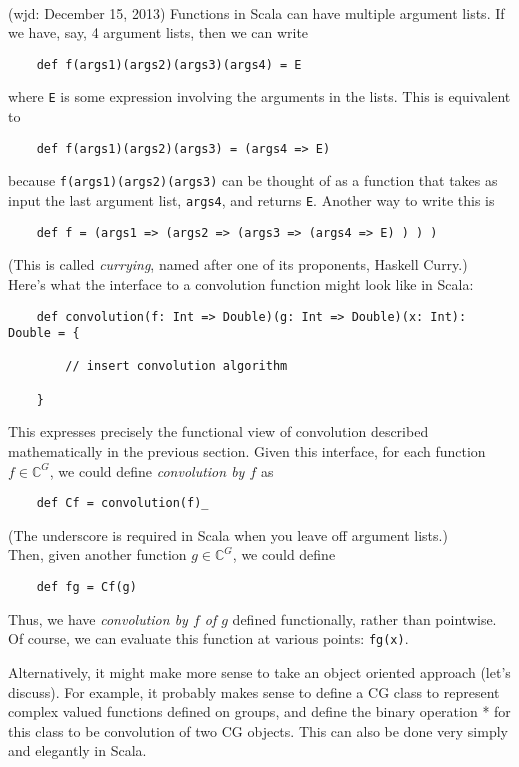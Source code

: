 \documentclass[11pt]{article}
\newcommand\C{\ensuremath{\mathbb{C}}}
\begin{document}
\\[5pt]  (wjd: December 15, 2013)
Functions in Scala can have multiple argument lists. If we have, say, 4
argument lists, then we can write
{\small
\begin{verbatim}
    def f(args1)(args2)(args3)(args4) = E
\end{verbatim}}
\noindent where {\tt E} is some expression involving the arguments in the lists.
This is equivalent to
{\small
\begin{verbatim}
    def f(args1)(args2)(args3) = (args4 => E)
\end{verbatim}}
\noindent because {\tt f(args1)(args2)(args3)} can be thought of as a function that takes
as input the last argument list, {\tt args4}, and returns {\tt E}.
Another way to write this is
{\small
\begin{verbatim}
    def f = (args1 => (args2 => (args3 => (args4 => E) ) ) )
\end{verbatim}}
\noindent (This is called \emph{currying}, named after one of its proponents, Haskell Curry.)
\\[5pt]  
Here's what the interface to a convolution function might look like in Scala:
{\small
\begin{verbatim}
    def convolution(f: Int => Double)(g: Int => Double)(x: Int): Double = {

        // insert convolution algorithm

    }
\end{verbatim}}
\noindent This expresses precisely the functional view of convolution
described mathematically in the previous section.  Given this interface, for each 
function $f \in \C^G$, we could define \emph{convolution by $f$} as
{\small
\begin{verbatim}
    def Cf = convolution(f)_
\end{verbatim}}
\noindent (The underscore is required in Scala when you leave off argument
lists.) 
\\[5pt]  
Then, given another function $g \in \C^G$, we could define
{\small
\begin{verbatim}
    def fg = Cf(g)
\end{verbatim}
}  
\noindent Thus, we have 
\emph{convolution by $f$ of $g$} defined functionally, rather than pointwise.
Of course, we can evaluate this function at various points: {\tt fg(x)}.

Alternatively, it might make more sense to take an object oriented approach (let's
discuss).  For example, it probably makes sense to define a CG class to
represent complex valued functions defined on groups, and define the binary
operation * for this class to be convolution of two CG objects.  This can also
be done very simply and elegantly in Scala. 
\end{document}

